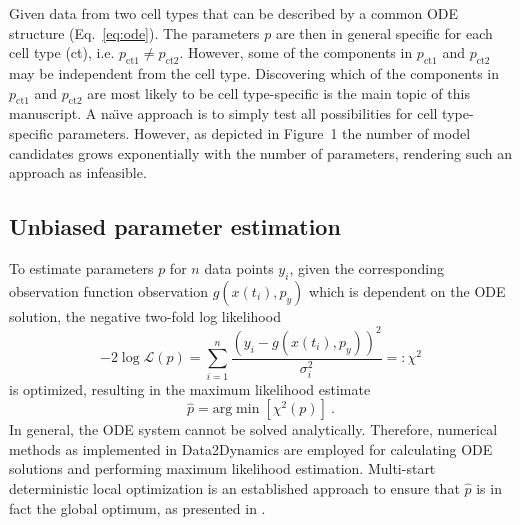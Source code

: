 \documentclass{bioinfo}
\begin{document}
Given data from two cell types that can be described by a common ODE structure (Eq.~\ref{eq:ode}).
The parameters $p$ are then in general specific for each cell type (ct), i.e. $p_\text{ct1} \neq p_\text{ct2}$.
However, some of the components in $p_\text{ct1}$ and $p_\text{ct2}$ may be independent from the cell type.
Discovering which of the components in $p_\text{ct1}$ and $p_\text{ct2}$ are most likely to be cell type-specific is the main topic of this manuscript.
A na\"{\i}ve approach is to simply test all possibilities for cell type-specific parameters.
However, as depicted in Figure~1\vphantom{\ref{fig:01}} the number of model candidates grows exponentially with the number of parameters, rendering such an approach as infeasible.

\subsection{Unbiased parameter estimation}

To estimate parameters $p$ for $n$ data points ${y_i}$, given the corresponding observation function observation $g(x(t_i),p_y)$ which is dependent on the ODE solution, the negative two-fold log likelihood
\begin{equation}
-2\log \mathcal L(p) = \sum_{i=1}^n \frac{(y_i-g(x(t_i),p_y))^2}{\sigma_i^2} =: \chi^2\label{eq:lik}
\end{equation}
is optimized, resulting in the maximum likelihood estimate
\begin{equation}
\hat p = \text{arg}\min \left[ \chi^2(p) \right] \:.
\end{equation}
In general, the ODE system cannot be solved analytically.
Therefore, numerical methods as implemented in Data2Dynamics \citep{Raue2015} are employed for calculating ODE solutions and performing maximum likelihood estimation.
Multi-start deterministic local optimization is an established approach to ensure that $\hat p$ is in fact the global optimum, as presented in \citep{Raue2013}.
\end{document}
